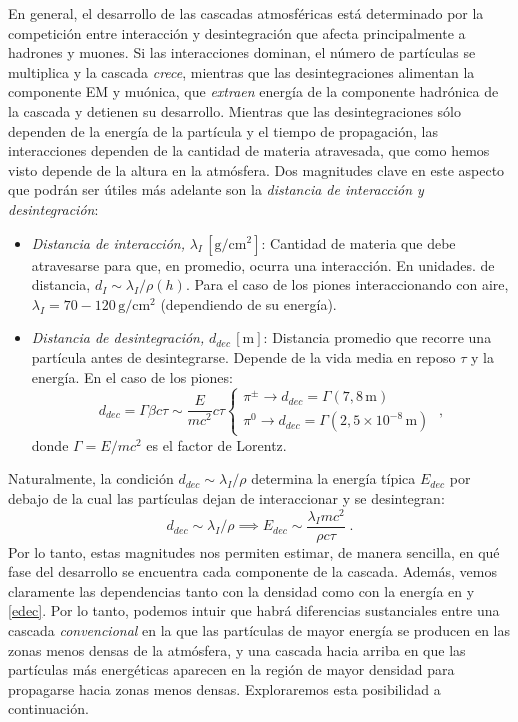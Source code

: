 \documentclass[11 pt, a4paper]{article} %
\numberwithin{equation}{section}
\numberwithin{figure}{section}
\numberwithin{table}{section}
\begin{document}
En general, el desarrollo de las cascadas atmosféricas está determinado por la competición entre interacción y desintegración que afecta principalmente a hadrones y muones. Si las interacciones dominan, el número de partículas se multiplica y la cascada \textit{crece}, mientras que las desintegraciones alimentan la componente EM y muónica, que \textit{extraen} energía de la componente hadrónica de la cascada y detienen su desarrollo. Mientras que las desintegraciones sólo dependen de la energía de la partícula y el tiempo de propagación, las interacciones dependen de la cantidad de materia atravesada, que como hemos visto depende de la altura en la atmósfera. Dos magnitudes clave en este aspecto que podrán ser útiles más adelante son la \textit{distancia de interacción y desintegración}:
\begin{itemize}
	\item \textit{Distancia de interacción,} $\lambda_I\,\left[\mathrm{g/cm^2}\right]$: Cantidad de materia que debe atravesarse para que, en promedio, ocurra una interacción. En unidades. de distancia, $d_I\sim\lambda_I/\rho(h)$. Para el caso de los piones interaccionando con aire, $\lambda_I=70-120\,\mathrm{g/cm^2}$ (dependiendo de su energía).

\item \textit{Distancia de desintegración, }$d_{dec}\,\left[\mathrm{m}\right]$: Distancia promedio que recorre una partícula antes de desintegrarse. Depende de la vida media en reposo $\tau$ y la energía. En el caso de los piones:
\begin{equation}
	d_{dec}=\Gamma\beta c\tau\sim\frac{E}{mc^2}c\tau\left\{\begin{array}{l}\pi^\pm\rightarrow d_{dec}=\Gamma\left(7,8 \,\mathrm{m}\right)\\
\pi^0\rightarrow d_{dec}=\Gamma\left(2,5\times10^{-8}\,\mathrm{m}\right)\end{array}\right.\;,
\label{ec24}
\end{equation}
donde $\Gamma = E/mc^2$ es el factor de Lorentz.
\end{itemize}
Naturalmente, la condición $d_{dec}\sim\lambda_I/\rho$ determina la energía típica $E_{dec}$ por debajo de la cual las partículas dejan de interaccionar y se desintegran:
\begin{equation}
	d_{dec}\sim\lambda_I/\rho\implies E_{dec}\sim \frac{\lambda_I mc^2}{\rho c \tau}\;.\label{edec}
\end{equation} Por lo tanto, estas magnitudes nos permiten estimar, de manera sencilla, en qué fase del desarrollo se encuentra cada componente de la cascada. Además, vemos claramente las dependencias tanto con la densidad como con la energía en y \eqref{edec}. Por lo tanto, podemos intuir que habrá diferencias sustanciales entre una cascada \textit{convencional} en la que las partículas de mayor energía se producen en las zonas menos densas de la atmósfera, y una cascada hacia arriba en que las partículas más energéticas aparecen en la región de mayor densidad para propagarse hacia zonas menos densas. Exploraremos esta posibilidad a continuación.
\end{document}
